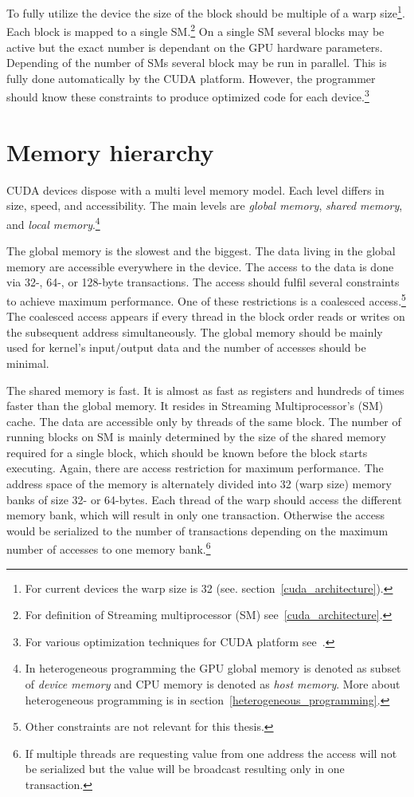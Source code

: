 \documentclass[12pt,oneside]{fithesis2}
\begin{document}
To fully utilize the device the size of the block should be multiple of a warp size\footnote{For current devices the warp size is 32 (see. section~\ref{cuda_architecture}).}. Each block is mapped to a single SM.\footnote{For definition of Streaming multiprocessor (SM) see~\ref{cuda_architecture}.} On a single SM several blocks may be active but the exact number is dependant on the GPU hardware parameters. Depending of the number of SMs several block may be run in parallel. This is fully done automatically by the CUDA platform. However, the programmer should know these constraints to produce optimized code for each device.\footnote{For various optimization techniques for CUDA platform see~\cite{cuda_best_practices}.}

\section{Memory hierarchy}
\label{memory_hiearchy}

CUDA devices dispose with a multi level memory model. Each level differs in size, speed, and accessibility. The main levels are \emph{global memory}, \emph{shared memory}, and \emph{local memory}.\footnote{In heterogeneous programming the GPU global memory is denoted as subset of \emph{device memory} and CPU memory is denoted as \emph{host memory}. More about heterogeneous programming is in section~\ref{heterogeneous_programming}.}~\cite{cuda_guide}

The global memory is the slowest and the biggest. The data living in the global memory are accessible everywhere in the device. The access to the data is done via 32-, 64-, or 128-byte transactions. The access should fulfil several constraints to achieve maximum performance. One of these restrictions is a coalesced access.\footnote{Other constraints are not relevant for this thesis.} The coalesced access appears if every thread in the block order reads or writes on the subsequent address simultaneously. The global memory should be mainly used for kernel's input/output data and the number of accesses should be minimal.

The shared memory is fast. It is almost as fast as registers and hundreds of times faster than the global memory. It resides in Streaming Multiprocessor's (SM) cache. The data are accessible only by threads of the same block. The number of running blocks on SM is mainly determined by the size of the shared memory required for a single block, which should be known before the block starts executing. Again, there are access restriction for maximum performance. The address space of the memory is alternately divided into 32 (warp size) memory banks of size 32- or 64-bytes. Each thread of the warp should access the different memory bank, which will result in only one transaction. Otherwise the access would be serialized to the number of transactions depending on the maximum number of accesses to one memory bank.\footnote{If multiple threads are requesting value from one address the access will not be serialized but the value will be broadcast resulting only in one transaction.}
\end{document}
